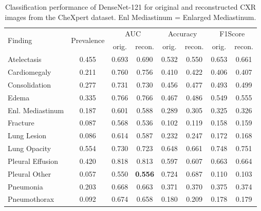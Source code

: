 \documentclass{article}
\begin{document}
\begin{table}[ht!]
\caption{Classification performance of  DenseNet-121 for original and reconstructed CXR images from the CheXpert dataset. Enl Mediastinum = Enlarged Mediastinum.}
\label{chexpert-recon-classification}
\centering
\begin{tabular}{@{}lccccccc@{}}
\toprule
\multirow{2}{*}{Finding}          & \multirow{2}{*}{Prevalence} & \multicolumn{2}{c}{AUC} & \multicolumn{2}{c}{Accuracy} & \multicolumn{2}{c}{F1Score} \\
                           &                             & orig.   & recon.          & orig.        & recon.        & orig.        & recon.       \\ \midrule
Atelectasis                & 0.455                       & 0.693   & 0.690           & 0.532        & 0.550         & 0.653        & 0.661        \\
Cardiomegaly               & 0.211                       & 0.760   & 0.756           & 0.410        & 0.422         & 0.406        & 0.407        \\
Consolidation              & 0.277                       & 0.731   & 0.730           & 0.456        & 0.477         & 0.493        & 0.499        \\
Edema                      & 0.335                       & 0.766   & 0.766           & 0.467        & 0.486         & 0.549        & 0.555        \\
Enl. Mediastinum & 0.187                       & 0.601   & 0.588           & 0.289        & 0.305         & 0.325        & 0.326        \\
Fracture                   & 0.087                       & 0.568   & 0.536           & 0.102        & 0.119         & 0.158        & 0.159        \\
Lung Lesion                & 0.086                       & 0.614   & 0.587           & 0.232        & 0.247         & 0.172        & 0.168        \\
Lung Opacity               & 0.554                       & 0.730   & 0.723           & 0.648        & 0.661         & 0.748        & 0.751        \\
Pleural Effusion           & 0.420                       & 0.818   & 0.813           & 0.597        & 0.607         & 0.663        & 0.664        \\
Pleural Other              & 0.057                       & 0.550   & \textbf{0.556}  & 0.724        & 0.687         & 0.110        & 0.103        \\
Pneumonia                  & 0.203                       & 0.668   & 0.663           & 0.371        & 0.370         & 0.375        & 0.374        \\
Pneumothorax               & 0.092                       & 0.674   & 0.658           & 0.180        & 0.209         & 0.178        & 0.179        \\ \bottomrule
\end{tabular}
\end{table}
\end{document}
